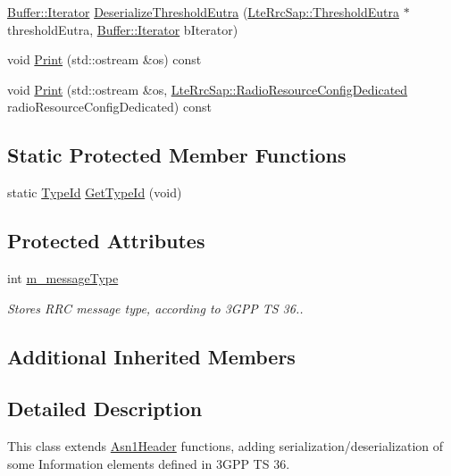 \begin{DoxyCompactItemize}
\item 
\hyperlink{classns3_1_1Buffer_1_1Iterator}{Buffer\+::\+Iterator} \hyperlink{classns3_1_1RrcAsn1Header_a80f5e686675bee0701149a16b9f2d37b}{Deserialize\+Threshold\+Eutra} (\hyperlink{structns3_1_1LteRrcSap_1_1ThresholdEutra}{Lte\+Rrc\+Sap\+::\+Threshold\+Eutra} $\ast$threshold\+Eutra, \hyperlink{classns3_1_1Buffer_1_1Iterator}{Buffer\+::\+Iterator} b\+Iterator)
\item 
void \hyperlink{classns3_1_1RrcAsn1Header_ac928fb6bdda0c08fe091355774582d55}{Print} (std\+::ostream \&os) const 
\item 
void \hyperlink{classns3_1_1RrcAsn1Header_aa300e96b9e7afc7b83805f2e1dc20720}{Print} (std\+::ostream \&os, \hyperlink{structns3_1_1LteRrcSap_1_1RadioResourceConfigDedicated}{Lte\+Rrc\+Sap\+::\+Radio\+Resource\+Config\+Dedicated} radio\+Resource\+Config\+Dedicated) const 
\end{DoxyCompactItemize}
\subsection*{Static Protected Member Functions}
\begin{DoxyCompactItemize}
\item 
static \hyperlink{classns3_1_1TypeId}{Type\+Id} \hyperlink{classns3_1_1RrcAsn1Header_ae34cbd61c9a672fae5b661b372e9a103}{Get\+Type\+Id} (void)
\end{DoxyCompactItemize}
\subsection*{Protected Attributes}
\begin{DoxyCompactItemize}
\item 
int \hyperlink{classns3_1_1RrcAsn1Header_ac4f5302ccdfed580e79d62f6be6a4bee}{m\+\_\+message\+Type}
\begin{DoxyCompactList}\small\item\em Stores R\+RC message type, according to 3\+G\+PP TS 36.. \end{DoxyCompactList}\end{DoxyCompactItemize}
\subsection*{Additional Inherited Members}


\subsection{Detailed Description}
This class extends \hyperlink{classns3_1_1Asn1Header}{Asn1\+Header} functions, adding serialization/deserialization of some Information elements defined in 3\+G\+PP TS 36. 


